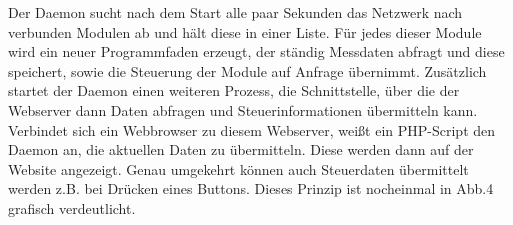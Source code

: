 \documentclass[a4paper,14pt,headsepline]{scrartcl}
\begin{document}
Der Daemon sucht nach dem Start alle paar Sekunden das Netzwerk nach verbunden Modulen ab und hält diese in einer Liste. Für jedes dieser Module wird ein neuer Programmfaden erzeugt, der ständig Messdaten abfragt und diese speichert, sowie die Steuerung der Module auf Anfrage übernimmt. Zusätzlich startet der Daemon einen weiteren Prozess, die Schnittstelle, über die der Webserver dann Daten abfragen und Steuerinformationen übermitteln kann. Verbindet sich ein Webbrowser zu diesem Webserver, weißt ein PHP-Script den Daemon an, die aktuellen Daten zu übermitteln. Diese werden dann auf der Website angezeigt. Genau umgekehrt können auch Steuerdaten übermittelt werden z.B. bei Drücken eines Buttons. Dieses Prinzip ist nocheinmal in Abb.4 grafisch verdeutlicht.

\newpage

\begin{figure}[h]
\begin{center}
\end{center}
\end{figure}
\end{document}

